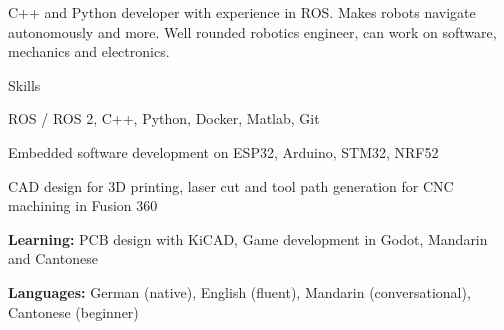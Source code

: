\documentclass[
	a4paper, %
	11pt, %
]{resume} %
\begin{document}
C++ and Python developer with experience in ROS. Makes robots navigate autonomously and more. Well rounded robotics engineer, can work on software, mechanics and electronics.


\begin{rSection}{Skills}

	\item ROS / ROS 2, C++, Python, Docker, Matlab, Git
	\item Embedded software development on ESP32, Arduino, STM32, NRF52
	\item CAD design for 3D printing, laser cut and tool path generation for CNC machining in Fusion 360
	\item \textbf{Learning:} PCB design with KiCAD, Game development in Godot, Mandarin and Cantonese
	\item \textbf{Languages:} German (native), English (fluent), Mandarin (conversational), Cantonese (beginner)

\end{rSection}


\end{document}
